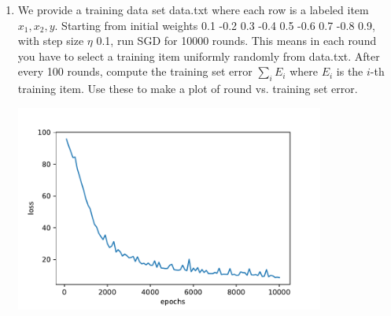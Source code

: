 \documentclass[a4paper]{article}
\theoremstyle{definition}
\newenvironment{soln}{
    \leavevmode\color{blue}\ignorespaces
}{}
\begin{document}
\begin{enumerate}
\begin{verbatim}
(weights) 1 0.9 0.8 0.7 0.6 0.5 0.4 0.3 0.2 (x) -0.2 1.7 (y) 0 (eta) 0.1
1.00000 0.90000 0.80000 0.70000 0.60000 0.50000 0.40000 0.30000 0.20000
0.31402
0.99609 0.90078 0.79335 0.69739 0.60052 0.49557 0.38697 0.27159 0.18136
0.29972

(weights) 4 3 2 1 0 -1 -2 -3 -4 (x) -4 1 (y) 0 (eta) 0.1
4.00000 3.00000 2.00000 1.00000 0.00000 -1.00000 -2.00000 -3.00000 -4.00000
0.00710
4.00000 3.00000 2.00000 1.00501 -0.02002 -0.99499 -2.00125 -3.00000 -4.00000
0.00371
\end{verbatim}
Print these for weights 0.1 -0.2 0.3 -0.4 0.5 -0.6 0.7 -0.8 0.9, input $x$ 1 -1, label $y$ 1, step size $\eta$ 0.1.

\begin{soln}
0.1, -0.2, 0.3, -0.4, 0.5, -0.6, 0.7, -0.8, 0.9\\
0.02187382\\
0.1, -0.2, 0.3, -0.39689, 0.50311, -0.60311, 0.70346, -0.8, 0.90242\\
0.02159976
\end{soln}

\item
We provide a training data set data.txt where each row is a labeled item $x_1, x_2, y$.
Starting from initial weights 0.1 -0.2 0.3 -0.4 0.5 -0.6 0.7 -0.8 0.9, with step size $\eta$ 0.1,
run SGD for 10000 rounds.  This means in each round you have to select a training item uniformly randomly from data.txt.
After every 100 rounds, compute the training set error $\sum_i E_i$ where $E_i$ is the $i$-th training item.
Use these to make a plot of round vs. training set error.

\begin{soln}
\includegraphics[width=4in]{Q26.pdf}
\end{soln}


\end{enumerate}
\end{document}
